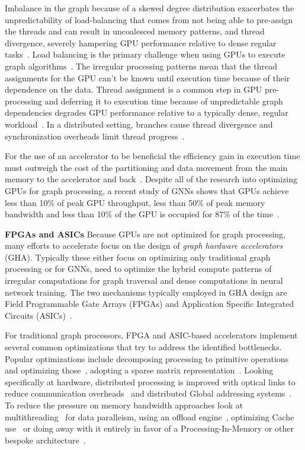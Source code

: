Imbalance in the graph because of a skewed degree distribution exacerbates the unpredictability of load-balancing that comes from not being able to pre-assign the threads and can result in uncoalesced memory patterns, and thread divergence, severely hampering GPU performance relative to dense regular tasks~\cite{Fu2014}. 
Load balancing is the primary challenge when using GPUs to execute graph algorithms~\cite{Wang2016}.
The irregular processing patterns mean that the thread assignments for the GPU can't be known until execution time because of their dependence on the data. 
Thread assignment is a common step in GPU pre-processing and deferring it to execution time because of unpredictable graph dependencies degrades GPU performance relative to a typically dense, regular workload~\cite{Fu2014}.
In a distributed setting, branches cause thread divergence and synchronization overheads limit thread progress~\cite{Aananthakrishnan2020}.

For the use of an accelerator to be beneficial the efficiency gain in execution time must outweigh the cost of the partitioning and data movement from the main memory to the accelerator and back~\cite{Azad2021}.
Despite all of the research into optimizing GPUs for graph processing, a recent study of GNNs shows that GPUs achieve less than 10\% of peak GPU throughput, less than 50\% of peak memory bandwidth and less than 10\% of the GPU is occupied for 87\% of the time~\cite{Huang2021}.

\textbf{FPGAs and ASICs}
Because GPUs are not optimized for graph processing, many efforts to accelerate \gai focus on the design of \textit{graph hardware accelerators} (GHA). 
Typically these either focus on optimizing only traditional graph processing or for GNNs, need to optimize the hybrid compute patterns of irregular computations for graph traversal and dense computations in neural network training.
The two mechanisms typically employed in GHA design are Field Programmable Gate Arrays (FPGAs) and Application Specific Integrated Circuits (ASICs)~\cite{Zhang2023}.

For traditional graph processors, FPGA and ASIC-based accelerators implement several common optimizations that try to address the identified bottlenecks. 
Popular optimizations include decomposing processing to primitive operations and optimizing those~\cite{Dadu2021, Chen2020}, adopting a sparse matrix representation~\cite{Song2016, Ham2016, Sundaram2015}.
Looking specifically at hardware, distributed processing is improved with optical links to reduce communication overheads~\cite{Song2016, Aananthakrishnan2020} and distributed Global addressing systems~\cite{Dysart2016, Aananthakrishnan2020}.
To reduce the pressure on memory bandwidth approaches look at multithreading~\cite{Aananthakrishnan2020} for data paralleism, using an offload engine~\cite{Aananthakrishnan2020}, optimizing Cache use~\cite{Sundaram2015,Dadu2021} or doing away with it entirely in favor of a Processing-In-Memory or other bespoke architecture~\cite{Song2016, Dadu2021, Dysart2016, Aananthakrishnan2020}.


